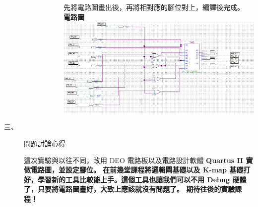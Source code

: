 \documentclass[12pt, a4paper]{article}
\begin{document}
\begin{description}
\begin{description}
\begin{description}
              \begin{minipage}{\linewidth}
                \normalfont
                先將電路圖畫出後，再將相對應的腳位對上，編譯後完成。\\
                \bf{電路圖} \\[.4cm]
                \includegraphics[width=12cm]{./image/Quartus-II.png}
              \end{minipage}
              
            \end{description}
          \normalsize  
        \normalsize
      \end{description}
    \item [三、]問題討論心得 \\[.6cm]
      \begin{minipage}[t]{\linewidth}
        \fontsize{16}{18}\selectfont
          這次實驗與以往不同，改用 DEO 電路板以及電路設計軟體 \bf{Quartus II} \normalfont 實做電路圖，並設定腳位。
          在前幾堂課程將邏輯閘基礎以及 K-map 基礎打好，學習新的工具比較能上手。這個工具也讓我們可以不用 Debug 硬體了，只要將電路圖畫好，大致上應該就沒有問題了。
          期待往後的實驗課程！
        \normalsize  
      \end{minipage}
  \normalsize
\end{description}
\end{document}
